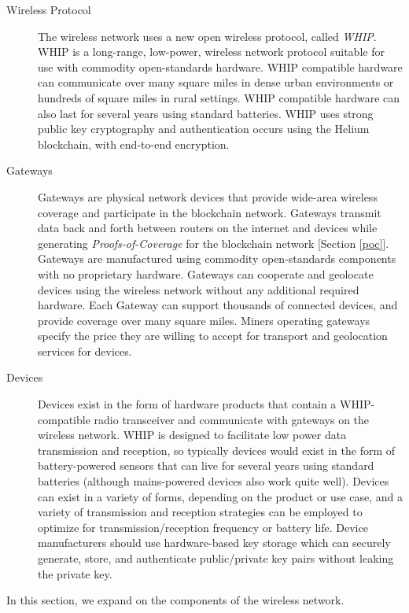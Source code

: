 \documentclass[10pt, nonatbib, nocopyrightspace, reprint]{sigplanconf}
\begin{document}
\begin{description}
        \item [Wireless Protocol] The wireless network uses a new open wireless protocol, called \emph{WHIP}. WHIP is a long-range, low-power, wireless network protocol suitable for use with commodity open-standards hardware. WHIP compatible hardware can communicate over many square miles in dense urban environments or hundreds of square miles in rural settings. WHIP compatible hardware can also last for several years using standard batteries. WHIP uses strong public key cryptography and authentication occurs using the Helium blockchain, with end-to-end encryption.

        \item [Gateways] Gateways are physical network devices that provide wide-area wireless coverage and participate in the blockchain network. Gateways transmit data back and forth between routers on the internet and devices while generating \emph{Proofs-of-Coverage} for the blockchain network [Section \ref{poc}]. Gateways are manufactured using commodity open-standards components with no proprietary hardware. Gateways can cooperate and geolocate devices using the wireless network without any additional required hardware. Each Gateway can support thousands of connected devices, and provide coverage over many square miles. Miners operating gateways specify the price they are willing to accept for transport and geolocation services for devices.

        \item [Devices] Devices exist in the form of hardware products that contain a WHIP-compatible radio transceiver and communicate with gateways on the wireless network. WHIP is designed to facilitate low power data transmission and reception, so typically devices would exist in the form of battery-powered sensors that can live for several years using standard batteries (although mains-powered devices also work quite well). Devices can exist in a variety of forms, depending on the product or use case, and a variety of transmission and reception strategies can be employed to optimize for transmission/reception frequency or battery life. Device manufacturers should use hardware-based key storage which can securely generate, store, and authenticate public/private key pairs without leaking the private key.
\end{description}

In this section, we expand on the components of the wireless network.
\end{document}
